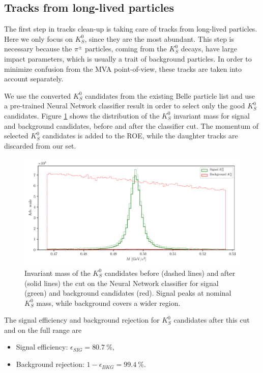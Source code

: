 \subsection{Tracks from long-lived particles}

The first step in tracks clean-up is taking care of tracks from long-lived particles. Here we only focus on $K_S^0$, since they are the most abundant. This step is necessary because the $\pi^\pm$ particles, coming from the $K_S^0$ decays, have large impact parameters, which is usually a trait of background particles. In order to minimize confusion from the MVA point-of-view, these tracks are taken into account separately.

We use the converted $K_S^0$ candidates from the existing Belle particle list and use a pre-trained Neural Network classifier result in order to select only the good $K_S^0$ candidates. Figure \ref{fig:ROE_V0} shows the distribution of the $K_S^0$ invariant mass for signal and background candidates, before and after the classifier cut. The momentum of selected $K_S^0$ candidates is added to the ROE, while the daughter tracks are discarded from our set.

\begin{figure}[H]
\centering
\captionsetup{width=0.8\linewidth}
\includegraphics[width=\linewidth]{fig/ROECleanup_V0}
\caption{Invariant mass of the $K_S^0$ candidates before (dashed lines) and after (solid lines) the cut on the Neural Network classifier for signal (green) and background candidates (red). Signal peaks at nominal $K_S^0$ mass, while background covers a wider region.}
\label{fig:ROE_V0}
\end{figure}

The signal efficiency and background rejection for $K_S^0$ candidates after this cut and on the full range are
\begin{itemize}
\item Signal efficiency: $\epsilon_{SIG} = 80.7~\%$,
\item Background rejection: $1-\epsilon_{BKG} = 99.4~\%$.
\end{itemize}

